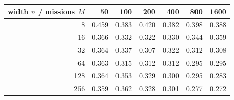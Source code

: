 \begin{tabular}{rrrrrrr}
\toprule
width $n$ / missions $M$ & 50 & 100 & 200 & 400 & 800 & 1600 \\
\midrule
8 & 0.459 & 0.383 & 0.420 & 0.382 & 0.398 & 0.388 \\
16 & 0.366 & 0.332 & 0.322 & 0.330 & 0.344 & 0.359 \\
32 & 0.364 & 0.337 & 0.307 & 0.322 & 0.312 & 0.308 \\
64 & 0.363 & 0.315 & 0.312 & 0.312 & 0.295 & 0.295 \\
128 & 0.364 & 0.353 & 0.329 & 0.300 & 0.295 & 0.283 \\
256 & 0.359 & 0.362 & 0.328 & 0.301 & 0.277 & 0.272 \\
\bottomrule
\end{tabular}